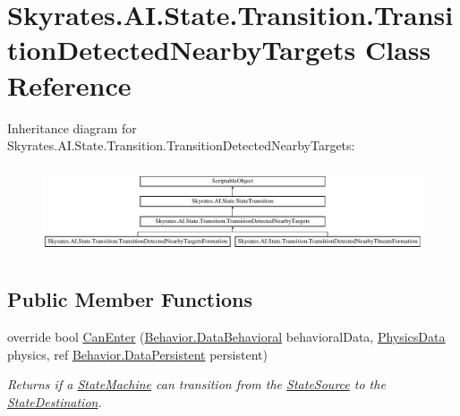 \hypertarget{class_skyrates_1_1_a_i_1_1_state_1_1_transition_1_1_transition_detected_nearby_targets}{\section{Skyrates.\-A\-I.\-State.\-Transition.\-Transition\-Detected\-Nearby\-Targets Class Reference}
\label{class_skyrates_1_1_a_i_1_1_state_1_1_transition_1_1_transition_detected_nearby_targets}
}
Inheritance diagram for Skyrates.\-A\-I.\-State.\-Transition.\-Transition\-Detected\-Nearby\-Targets\-:\begin{figure}[H]
\begin{center}
\leavevmode
\includegraphics[height=2.635294cm]{class_skyrates_1_1_a_i_1_1_state_1_1_transition_1_1_transition_detected_nearby_targets}
\end{center}
\end{figure}
\subsection*{Public Member Functions}
\begin{DoxyCompactItemize}
\item 
override bool \hyperlink{class_skyrates_1_1_a_i_1_1_state_1_1_transition_1_1_transition_detected_nearby_targets_ac136c79933da8c0d6d245e81f4bf9210}{Can\-Enter} (\hyperlink{class_skyrates_1_1_a_i_1_1_behavior_1_1_data_behavioral}{Behavior.\-Data\-Behavioral} behavioral\-Data, \hyperlink{class_skyrates_1_1_physics_1_1_physics_data}{Physics\-Data} physics, ref \hyperlink{class_skyrates_1_1_a_i_1_1_behavior_1_1_data_persistent}{Behavior.\-Data\-Persistent} persistent)
\begin{DoxyCompactList}\small\item\em Returns if a \hyperlink{class_skyrates_1_1_a_i_1_1_state_1_1_state_machine}{State\-Machine} can transition from the \hyperlink{class_skyrates_1_1_a_i_1_1_state_1_1_state_transition_a15c97c73b5e83f2bda77c5f4fb2521c6}{State\-Source} to the \hyperlink{class_skyrates_1_1_a_i_1_1_state_1_1_state_transition_a445177b14011fbc85aec78ecd04680f8}{State\-Destination}. \end{DoxyCompactList}\end{DoxyCompactItemize}
